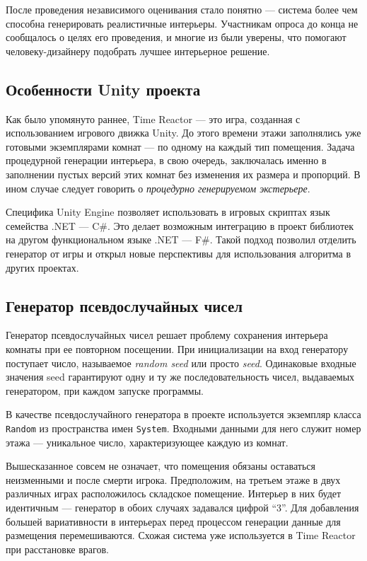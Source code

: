 После проведения независимого оценивания стало понятно --- система более чем способна генерировать реалистичные интерьеры. Участникам опроса до конца не сообщалось о целях его проведения, и многие из были уверены, что помогают человеку-дизайнеру подобрать лучшее интерьерное решение.

\subsection{Особенности Unity проекта}

Как было упомянуто раннее, Time Reactor --- это игра, созданная с использованием игрового движка Unity. До этого времени этажи заполнялись уже готовыми экземплярами комнат --- по одному на каждый тип помещения. Задача процедурной генерации интерьера, в свою очередь, заключалась именно в заполнении пустых версий этих комнат без изменения их размера и пропорций. В ином случае следует говорить о \textit{процедурно генерируемом экстерьере}.

Специфика Unity Engine позволяет использовать в игровых скриптах язык семейства .NET --- C\#. Это делает возможным интеграцию в проект библиотек на другом функциональном языке .NET --- F\#. Такой подход позволил отделить генератор от игры и открыл новые перспективы для использования алгоритма в других проектах.  

\subsection{Генератор псевдослучайных чисел}

Генератор псевдослучайных чисел решает проблему сохранения интерьера комнаты при ее повторном посещении. При инициализации на вход генератору поступает число, называемое \textit{random seed} или просто \textit{seed}. Одинаковые входные значения seed гарантируют одну и ту же последовательность чисел, выдаваемых генератором, при каждом запуске программы. 

В качестве псевдослучайного генератора в проекте используется экземпляр класса \texttt{Random} из пространства имен \texttt{System}. Входными данными для него служит номер этажа --- уникальное число, характеризующее каждую из комнат.

Вышесказанное совсем не означает, что помещения обязаны оставаться неизменными и после смерти игрока. Предположим, на третьем этаже в двух различных играх расположилось складское помещение. Интерьер в них будет идентичным --- генератор в обоих случаях задавался цифрой \enquote{3}. Для добавления большей вариативности в интерьерах перед процессом генерации данные для размещения перемешиваются. Схожая система уже используется в Time Reactor при расстановке врагов.
 